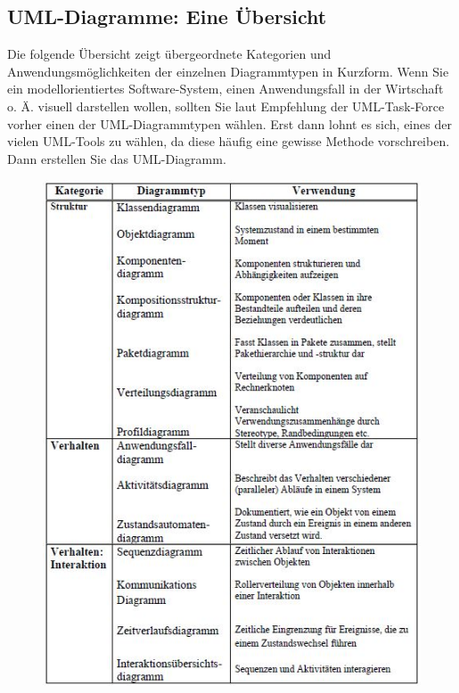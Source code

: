 \subsection{UML-Diagramme: Eine Übersicht}
Die folgende Übersicht zeigt übergeordnete Kategorien und Anwendungsmöglichkeiten der einzelnen Diagrammtypen in Kurzform. Wenn Sie ein modellorientiertes Software-System, einen Anwendungsfall in der Wirtschaft o. Ä. visuell darstellen wollen, sollten Sie laut Empfehlung der UML-Task-Force vorher einen der UML-Diagrammtypen wählen. Erst dann lohnt es sich, eines der vielen UML-Tools zu wählen, da diese häufig eine gewisse Methode vorschreiben. Dann erstellen Sie das UML-Diagramm.\cite{MT011} \\
\begin{center}
\begin{figure}[h]
   

\includegraphics[scale=0.8]{Graphics/UMLdiagramme.jpg} 


 
\label{fig5}


\end{figure}
\end{center}
\newpage
